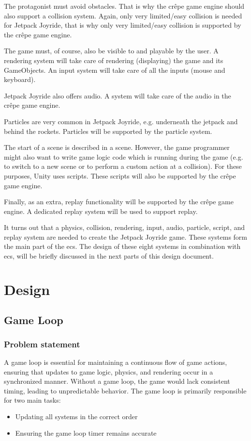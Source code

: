 \documentclass{projdoc}
\begin{document}
The protagonist must avoid obstacles. That is why the cr\^epe game engine should also
support a collision system. Again, only very limited/easy collision is needed for
Jetpack Joyride, that is why only very limited/easy collision is supported by the
cr\^epe game engine.

The game must, of course, also be visible to and playable by the user. A rendering
system will take care of rendering (displaying) the game and its GameObjects. An
input system will take care of all the inputs (mouse and keyboard).

Jetpack Joyride also offers audio. A system will take care of the audio in the
cr\^epe game engine.

Particles are very common in Jetpack Joyride, e.g. underneath the jetpack and behind
the rockets. Particles will be supported by the particle system.

The start of a scene is described in a scene. However, the game programmer might also
want to write game logic code which is running during the game (e.g. to switch to a
new scene or to perform a custom action at a collision). For these purposes, Unity
uses scripts. These scripts will also be supported by the cr\^epe game engine.

Finally, as an extra, replay functionality will be supported by the cr\^epe game
engine. A dedicated replay system will be used to support replay.

It turns out that a physics, collision, rendering, input, audio, particle, script,
and replay system are needed to create the Jetpack Joyride game. These systems form
the main part of the \gls{ecs}. The design of these eight systems in combination with
\gls{ecs}, will be briefly discussed in the next parts of this design document.

\section{Design}
\subsection{Game Loop}

\subsubsection{Problem statement}

A game loop is essential for maintaining a continuous flow of game actions, ensuring
that updates to game logic, physics, and rendering occur in a synchronized manner.
Without a game loop, the game would lack consistent timing, leading to unpredictable
behavior. The game loop is primarily responsible for two main tasks:\noparbreak
\begin{itemize}
	\item Updating all systems in the correct order
	\item Ensuring the game loop timer remains accurate
\end{itemize}
\end{document}
